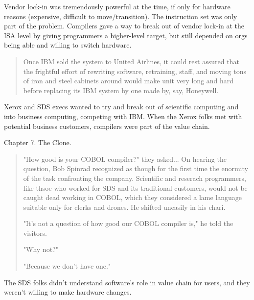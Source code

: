 Vendor lock-in was tremendously powerful at the time, if only for hardware reasons (expensive, difficult to move/transition).
The instruction set was only part of the problem.
Compilers gave a way to break out of vendor lock-in at the ISA level by giving programmers
a higher-level target, but still depended on orgs being able and willing to switch hardware.
\begin{quotation}
Once IBM sold the system to United Airlines, it could rest assured that the frightful effort of rewriting software,
retraining, staff, and moving tons of iron and steel cabinets around would make unit very long and hard before 
replacing its IBM system by one made by, say, Honeywell.
\end{quotation}

Xerox and SDS execs wanted to try and break out of scientific computing and into business computing,
competing with IBM.
When the Xerox folks met with potential business customers, compilers were part of the value chain.

Chapter 7. The Clone.

\begin{quotation}
"How good is your COBOL compiler?" they asked...
On hearing the question, Bob Spinrad recognized as though for the first time the enormity of the task confronting the company.
Scientific and reserach programmers, like thsoe who worked for SDS and its traditional customers,
would not be caught dead working in COBOL, which they considered a lame language suitable only for clerks and drones.
He shifted uneasily in his chari.

"It's not a question of how good our COBOL compiler is," he told the visitors.

"Why not?"

"Because we don't have one."
\end{quotation}

The SDS folks didn't understand software's role in value chain for users,
and they weren't willing to make hardware changes.

